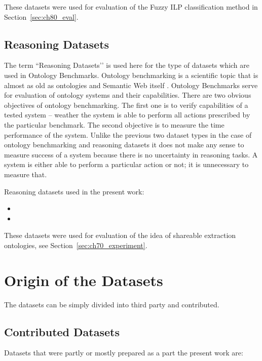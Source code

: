 These datasets were used for evaluation of the Fuzzy ILP classification method in Section~\ref{sec:ch80_eval}. 


\subsection{Reasoning Datasets}


The term ``Reasoning Datasets’’ is used here for the type of datasets which are used in Ontology Benchmarks. Ontology benchmarking is a scientific topic that is almost as old as ontologies and Semantic Web itself \cite{DBLP:conf/semweb/GuoHP03}. Ontology Benchmarks serve for evaluation of ontology systems and their capabilities. There are two obvious objectives of ontology benchmarking. The first one is to verify capabilities of a tested system -- weather the system is able to perform all actions prescribed by the particular benchmark. The second objective is to measure the time performance of the system. Unlike the previous two dataset types in the case of ontology benchmarking and reasoning datasets it does not make any sense to measure success of a system because there is no uncertainty in reasoning tasks. A system is either able to perform a particular action or not; it is unnecessary to measure that. 

Reasoning datasets used in the present work:
\begin{itemize}
	\item {}
	\item {}
\end{itemize}

These datasets were used for evaluation of the idea of shareable extraction ontologies, see Section~\ref{sec:ch70_experiment}. 

\section{Origin of the Datasets}
The datasets can be simply divided into third party and contributed. 
\subsection{Contributed Datasets}
Datasets that were partly or mostly prepared as a part the present work are:


